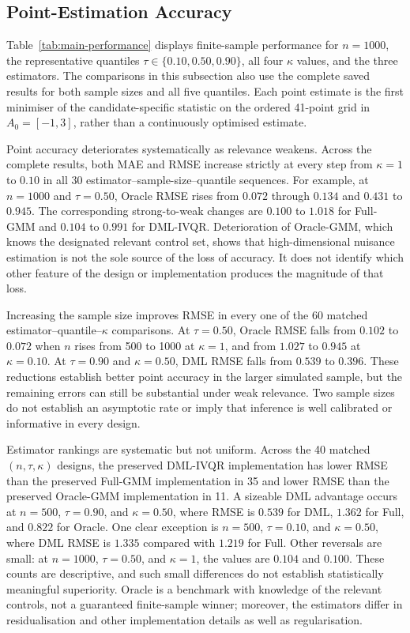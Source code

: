 \subsection{Point-Estimation Accuracy}
\label{sec:results-point-accuracy}

Table~\ref{tab:main-performance} displays finite-sample performance for $n=1000$, the representative quantiles $\tau\in\{0.10,0.50,0.90\}$, all four $\kappa$ values, and the three estimators. The comparisons in this subsection also use the complete saved results for both sample sizes and all five quantiles. Each point estimate is the first minimiser of the candidate-specific statistic on the ordered 41-point grid in $A_0=[-1,3]$, rather than a continuously optimised estimate.



Point accuracy deteriorates systematically as relevance weakens. Across the complete results, both MAE and RMSE increase strictly at every step from $\kappa=1$ to $0.10$ in all 30 estimator--sample-size--quantile sequences. For example, at $n=1000$ and $\tau=0.50$, Oracle RMSE rises from $0.072$ through $0.134$ and $0.431$ to $0.945$. The corresponding strong-to-weak changes are $0.100$ to $1.018$ for Full-GMM and $0.104$ to $0.991$ for DML-IVQR. Deterioration of Oracle-GMM, which knows the designated relevant control set, shows that high-dimensional nuisance estimation is not the sole source of the loss of accuracy. It does not identify which other feature of the design or implementation produces the magnitude of that loss.

Increasing the sample size improves RMSE in every one of the 60 matched estimator--quantile--$\kappa$ comparisons. At $\tau=0.50$, Oracle RMSE falls from $0.102$ to $0.072$ when $n$ rises from 500 to 1000 at $\kappa=1$, and from $1.027$ to $0.945$ at $\kappa=0.10$. At $\tau=0.90$ and $\kappa=0.50$, DML RMSE falls from $0.539$ to $0.396$. These reductions establish better point accuracy in the larger simulated sample, but the remaining errors can still be substantial under weak relevance. Two sample sizes do not establish an asymptotic rate or imply that inference is well calibrated or informative in every design.

Estimator rankings are systematic but not uniform. Across the 40 matched $(n,\tau,\kappa)$ designs, the preserved DML-IVQR implementation has lower RMSE than the preserved Full-GMM implementation in 35 and lower RMSE than the preserved Oracle-GMM implementation in 11. A sizeable DML advantage occurs at $n=500$, $\tau=0.90$, and $\kappa=0.50$, where RMSE is $0.539$ for DML, $1.362$ for Full, and $0.822$ for Oracle. One clear exception is $n=500$, $\tau=0.10$, and $\kappa=0.50$, where DML RMSE is $1.335$ compared with $1.219$ for Full. Other reversals are small: at $n=1000$, $\tau=0.50$, and $\kappa=1$, the values are $0.104$ and $0.100$. These counts are descriptive, and such small differences do not establish statistically meaningful superiority. Oracle is a benchmark with knowledge of the relevant controls, not a guaranteed finite-sample winner; moreover, the estimators differ in residualisation and other implementation details as well as regularisation.

